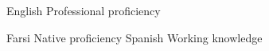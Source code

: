
\begin{cvskills}

  \cvskill
    {English} %
    {Professional proficiency} %

  \cvskill
    {Farsi} %
    {Native proficiency} %
  \cvskill
    {Spanish} %
    {Working knowledge} %

\end{cvskills}
